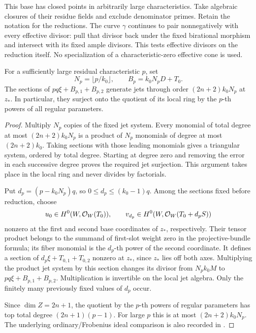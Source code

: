 This base has closed points in arbitrarily large characteristics.
Take algebraic closures of their residue fields and exclude
denominator primes. Retain the notation for the reductions.
The curve $\gamma$ continues to pair nonnegatively with every
effective divisor: pull that divisor back under the fixed
birational morphism and intersect with its fixed ample divisors.
This tests effective divisors on the reduction itself. No
specialization of a characteristic-zero effective cone is used.

\begin{lemma}\label{fr:positive-characteristic-jets}
For a sufficiently large residual characteristic $p$, set
\[
 N_p=\lfloor p/k_0\rfloor,\qquad B_p=k_0N_pD+T_0.
\]
The sections of $pq\xi+B_{p,1}+B_{p,2}$ generate jets through order
$(2n+2)k_0N_p$ at $z_*$.  In particular, they surject onto the quotient
of its local ring by the $p$-th powers of all regular parameters.
\end{lemma}

\begin{proof}
Multiply $N_p$ copies of the fixed jet system.  Every monomial of
total degree at most $(2n+2)k_0N_p$ is a product of $N_p$ monomials
of degree at most $(2n+2)k_0$.  Taking sections with those leading
monomials gives a triangular system, ordered by total degree.
Starting at degree zero and removing the error in each successive
degree proves the required jet surjection. This argument takes
place in the local ring and never divides by factorials.

Put $d_p=(p-k_0N_p)q$, so $0\le d_p\le(k_0-1)q$.
Among the sections fixed before reduction, choose
\[
 u_0\in H^0(W,\mathcal O_W(T_0)),\qquad
 v_{d_p}\in H^0(W,\mathcal O_W(T_0+d_pS))
\]
nonzero at the first and second base coordinates of $z_*$,
respectively. Their tensor product belongs to the summand of
first-slot weight zero in the projective-bundle formula; its
fiber monomial is the $d_p$-th power of the second coordinate.
It defines a section of
$d_p\xi+T_{0,1}+T_{0,2}$ nonzero at $z_*$, since $z_*$ lies
off both axes. Multiplying the product jet system by this section
changes its divisor from $N_pk_0M$ to
$pq\xi+B_{p,1}+B_{p,2}$. Multiplication is invertible on the
local jet algebra. Only the finitely many previously fixed
values of $d_p$ occur.

Since $\dim Z=2n+1$, the
quotient by the $p$-th powers of regular parameters has top total
degree $(2n+1)(p-1)$.  For large $p$ this is at most
$(2n+2)k_0N_p$. The underlying ordinary/Frobenius ideal comparison is
also recorded in \cite[proof of Proposition~2.12, Equation~(2.8)]{MustataSchwede}.
\end{proof}

